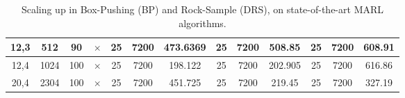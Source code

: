 \documentclass[runningheads]{llncs}
\begin{document}
{\begin{table}[t]
\begin{tabular}{|c|c|c|c||c|c|c||c|c|c||c|c|c|}
         12,3 & 512 & 90 & $\times$  & 25 & 7200 & 473.6369 & 25 & 7200 & 508.85 & 25 & 7200 & 608.91 \\ %
         
         \hline
         
         12,4 & 1024 & 100 & $\times$ & 25 & 7200 & 198.122 & 25 & 7200 & 202.905 & 25 & 7200 & 616.86 \\ %
         
         \hline
         
         20,4 & 2304 & 100 & $\times$  & 25 & 7200 & 451.725 & 25 & 7200 & 219.45 & 25 & 7200 & 327.19 \\
         \hline
         
    \end{tabular}
    
    \caption{\label{tbl:scaleBP_DRS}
    Scaling up in Box-Pushing (BP) and Rock-Sample (DRS), on state-of-the-art MARL algorithms.
    }
\end{table}
}
\end{document}
